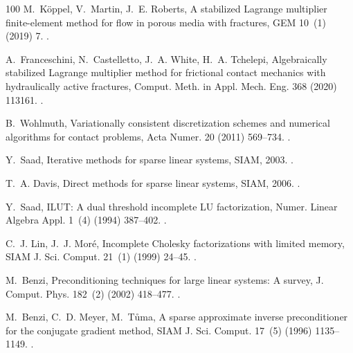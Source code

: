 \documentclass[3p,times]{elsarticle}
\theoremstyle{plain}
\begin{document}
\begin{thebibliography}{100}
M.~K{\"o}ppel, V.~Martin, J.~E. Roberts, {A stabilized Lagrange multiplier
  finite-element method for flow in porous media with fractures}, GEM 10~(1)
  (2019) 7.
\newblock \href {https://doi.org/10.1007/s13137-019-0117-7}
  {}.

A.~Franceschini, N.~Castelletto, J.~A. White, H.~A. Tchelepi, {Algebraically
  stabilized Lagrange multiplier method for frictional contact mechanics with
  hydraulically active fractures}, Comput. Meth. in Appl. Mech. Eng. 368 (2020)
  113161.
\newblock \href {https://doi.org/10.1016/j.cma.2020.113161}
  {}.

B.~Wohlmuth, {Variationally consistent discretization schemes and numerical
  algorithms for contact problems}, Acta Numer. 20 (2011) 569--734.
\newblock \href {https://doi.org/10.1017/s0962492911000079}
  {}.

Y.~Saad, {Iterative methods for sparse linear systems}, SIAM, 2003.
\newblock \href {https://doi.org/10.1137/1.9780898718003}
  {}.

T.~A. Davis, {Direct methods for sparse linear systems}, SIAM, 2006.
\newblock \href {https://doi.org/10.1137/1.9780898718881}
  {}.

Y.~Saad, {ILUT: A dual threshold incomplete LU factorization}, Numer. Linear
  Algebra Appl. 1~(4) (1994) 387--402.
\newblock \href {https://doi.org/10.1002/nla.1680010405}
  {}.

C.~J. Lin, J.~J. Mor{\'e}, {Incomplete Cholesky factorizations with limited
  memory}, SIAM J. Sci. Comput. 21~(1) (1999) 24--45.
\newblock \href {https://doi.org/10.1137/S1064827597327334}
  {}.

M.~Benzi, {Preconditioning techniques for large linear systems: A survey}, J.
  Comput. Phys. 182~(2) (2002) 418--477.
\newblock \href {https://doi.org/10.1006/jcph.2002.7176}
  {}.

M.~Benzi, C.~D. Meyer, M.~T{\r u}ma, {A sparse approximate inverse
  preconditioner for the conjugate gradient method}, SIAM J. Sci. Comput.
  17~(5) (1996) 1135--1149.
\newblock \href {https://doi.org/10.1137/S1064827594271421}
  {}.


\end{thebibliography}
\end{document}
